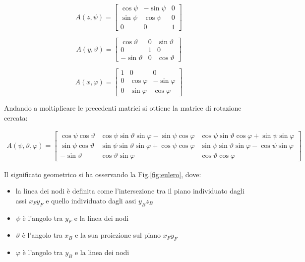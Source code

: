 \begin{equation}
A(z,\psi)= \begin{bmatrix}
\cos\psi   &-\sin\psi & 0 \\
\sin\psi     & \cos\psi  & 0 \\
0      & 0 & 1
\end{bmatrix}
\end{equation}

\begin{equation}
A(y,\vartheta)= \begin{bmatrix}
\cos\vartheta   &0 & \sin\vartheta \\
0    & 1  & 0 \\
-\sin\vartheta     & 0 & \cos\vartheta
\end{bmatrix}
\end{equation}


\begin{equation}
A(x,\varphi)= \begin{bmatrix}
1   &0 & 0 \\
0    & \cos\varphi  & -\sin\varphi\\
0     & \sin\varphi & \cos\varphi
\end{bmatrix}
\end{equation}

Andando a moltiplicare le precedenti matrici si ottiene la matrice di rotazione cercata:

\begin{eqnarray}
\label{matriceRotazione}
A(\psi,\vartheta,\varphi)= \begin{bmatrix}
\cos\psi \cos\vartheta  & \cos\psi \sin\vartheta \sin\varphi-\sin\psi \cos\varphi & \cos\psi \sin\vartheta \cos\varphi + \sin\psi \sin\varphi \\
\sin\psi \cos\vartheta    & \sin\psi \sin\vartheta \sin\varphi+\cos\psi \cos\varphi & \sin\psi \sin\vartheta \sin\varphi - \cos\psi \sin\varphi\\
-\sin\vartheta    & \cos\vartheta\sin\varphi & \cos\vartheta\cos\varphi
\end{bmatrix}
\end{eqnarray}

Il significato geometrico si ha osservando la Fig.\ref{fig:eulero}, dove:
\begin{itemize}
	\item la linea dei nodi è definita come l'intersezione tra il piano individuato dagli assi $x_Fy_F$ e quello individuato dagli assi $y_Bz_B$
	\item $\psi$ è l'angolo tra $y_F$ e la linea dei nodi
	\item $\vartheta$ è l'angolo tra $x_B$ e la sua proiezione sul piano $x_Fy_F$
	\item $\varphi$ è l'angolo tra $y_B$ e la linea dei nodi
\end{itemize}

